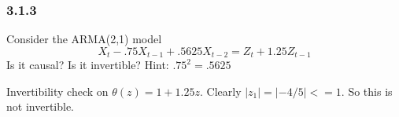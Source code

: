 \documentclass{beamer}
\begin{document}

\begin{frame}
\frametitle{3.1.3}
Consider the ARMA(2,1) model 
\[
X_t - .75 X_{t-1} + .5625 X_{t-2} = Z_t + 1.25 Z_{t-1} 
\]
Is it causal? Is it invertible? Hint: $.75^2 = .5625$
\pause
\newline

Invertibility check on $\theta(z) = 1 + 1.25 z$. Clearly $|z_1| = |-4/5| <= 1$. So this is not invertible.

\end{frame}
\end{document}
